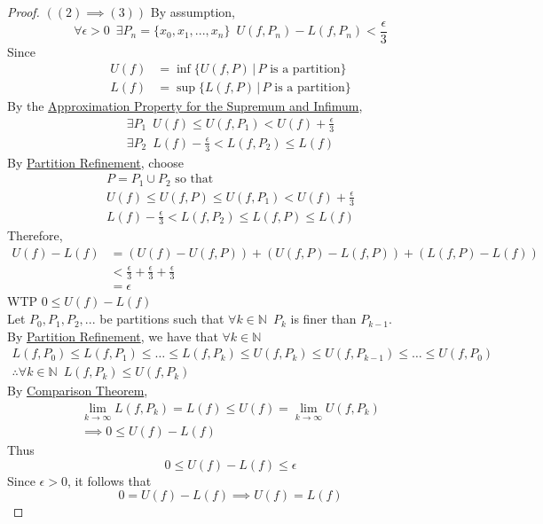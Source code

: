 \documentclass[11pt, oneside]{book}
\theoremstyle{break}
\newtheorem*{proof}{Proof}
\newcommand{\bb}[1]{\mathbb{#1}}			%
\begin{document}
\begin{proof}
	$((2) \implies (3))$
	By assumption,
	\begin{equation*}
		\forall \epsilon > 0 \enspace \exists P_n = \{x_0, x_1, ..., x_n\} \enspace U(f, P_n) - L(f, P_n) < \frac{\epsilon}{3}
	\end{equation*}
	Since
	\begin{align*}
		U(f) &= \inf \{U(f, P) \, | \, P \text{ is a partition} \} \\
		L(f) &= \sup \{L(f, P) \, | \, P \text{ is a partition} \}
	\end{align*}
	By the \hyperref[approx_prop]{Approximation Property for the Supremum and Infimum},
	\begin{gather*}
		\exists P_1 \enspace U(f) \leq U(f, P_1) < U(f) + \frac{\epsilon}{3} \\
		\exists P_2 \enspace L(f) - \frac{\epsilon}{3} < L(f, P_2) \leq L(f)
	\end{gather*}
	By \hyperref[partition_refinement]{Partition Refinement}, choose
	\begin{gather*}
		P = P_1 \cup P_2 \text{ so that} \\
		U(f) \leq U(f, P) \leq U(f, P_1) < U(f) + \frac{\epsilon}{3} \\
		L(f) - \frac{\epsilon}{3} < L(f, P_2) \leq L(f, P) \leq L(f)
	\end{gather*}
	Therefore,
	\begin{align*}
		U(f) - L(f) &= (U(f) - U(f, P)) + (U(f, P) - L(f, P)) + (L(f, P) - L(f)) \\
					&< \frac{\epsilon}{3} + \frac{\epsilon}{3} + \frac{\epsilon}{3} \\
					&= \epsilon
	\end{align*}
	WTP $0 \leq U(f) - L(f)$ \\
	Let $P_0, P_1, P_2, ...$ be partitions such that $\forall k \in \bb{N} \enspace P_k$ is finer than $P_{k-1}$. \\
	By \hyperref[partition_refinement]{Partition Refinement}, we have that $\forall k \in \bb{N}$
	\begin{gather*}
		L(f, P_0) \leq L(f, P_1) \leq \hdots \leq L(f, P_k) \leq U(f, P_k) \leq U(f, P_{k - 1}) \leq \hdots \leq U(f, P_0) \\
		\therefore \forall k \in \bb{N} \enspace L(f, P_k) \leq U(f, P_k)
	\end{gather*}
	By \hyperref[comparison_seq]{Comparison Theorem},
	\begin{gather*}
		\lim_{k \to \infty} L(f, P_k) = L(f) \leq U(f) = \lim_{k \to \infty} U(f, P_k) \\
		\implies 0 \leq U(f) - L(f)
	\end{gather*}
	Thus
	\begin{equation*}
		0 \leq U(f) - L(f) \leq \epsilon
	\end{equation*}
	Since $\epsilon > 0$, it follows that
	\begin{equation*}
		0 = U(f) - L(f) \implies U(f) = L(f)
	\end{equation*}


\end{proof}
\end{document}
